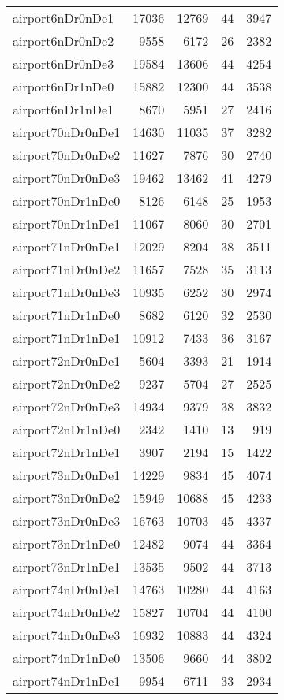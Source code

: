 \begin{longtable}{lrrrr}
airport6nDr0nDe1 & 17036 & 12769 & 44 & 3947 \\
airport6nDr0nDe2 & 9558 & 6172 & 26 & 2382 \\
airport6nDr0nDe3 & 19584 & 13606 & 44 & 4254 \\
airport6nDr1nDe0 & 15882 & 12300 & 44 & 3538 \\
airport6nDr1nDe1 & 8670 & 5951 & 27 & 2416 \\
airport70nDr0nDe1 & 14630 & 11035 & 37 & 3282 \\
airport70nDr0nDe2 & 11627 & 7876 & 30 & 2740 \\
airport70nDr0nDe3 & 19462 & 13462 & 41 & 4279 \\
airport70nDr1nDe0 & 8126 & 6148 & 25 & 1953 \\
airport70nDr1nDe1 & 11067 & 8060 & 30 & 2701 \\
airport71nDr0nDe1 & 12029 & 8204 & 38 & 3511 \\
airport71nDr0nDe2 & 11657 & 7528 & 35 & 3113 \\
airport71nDr0nDe3 & 10935 & 6252 & 30 & 2974 \\
airport71nDr1nDe0 & 8682 & 6120 & 32 & 2530 \\
airport71nDr1nDe1 & 10912 & 7433 & 36 & 3167 \\
airport72nDr0nDe1 & 5604 & 3393 & 21 & 1914 \\
airport72nDr0nDe2 & 9237 & 5704 & 27 & 2525 \\
airport72nDr0nDe3 & 14934 & 9379 & 38 & 3832 \\
airport72nDr1nDe0 & 2342 & 1410 & 13 & 919 \\
airport72nDr1nDe1 & 3907 & 2194 & 15 & 1422 \\
airport73nDr0nDe1 & 14229 & 9834 & 45 & 4074 \\
airport73nDr0nDe2 & 15949 & 10688 & 45 & 4233 \\
airport73nDr0nDe3 & 16763 & 10703 & 45 & 4337 \\
airport73nDr1nDe0 & 12482 & 9074 & 44 & 3364 \\
airport73nDr1nDe1 & 13535 & 9502 & 44 & 3713 \\
airport74nDr0nDe1 & 14763 & 10280 & 44 & 4163 \\
airport74nDr0nDe2 & 15827 & 10704 & 44 & 4100 \\
airport74nDr0nDe3 & 16932 & 10883 & 44 & 4324 \\
airport74nDr1nDe0 & 13506 & 9660 & 44 & 3802 \\
airport74nDr1nDe1 & 9954 & 6711 & 33 & 2934 \\

\end{longtable}
